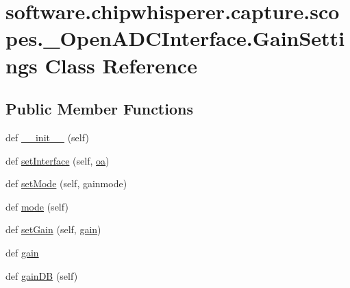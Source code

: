 \hypertarget{classsoftware_1_1chipwhisperer_1_1capture_1_1scopes_1_1__OpenADCInterface_1_1GainSettings}{}\section{software.\+chipwhisperer.\+capture.\+scopes.\+\_\+\+Open\+A\+D\+C\+Interface.\+Gain\+Settings Class Reference}
\label{classsoftware_1_1chipwhisperer_1_1capture_1_1scopes_1_1__OpenADCInterface_1_1GainSettings}
\subsection*{Public Member Functions}
\begin{DoxyCompactItemize}
\item 
def \hyperlink{classsoftware_1_1chipwhisperer_1_1capture_1_1scopes_1_1__OpenADCInterface_1_1GainSettings_a3156c2b37e5de144a8bd6e1d27eb5b51}{\+\_\+\+\_\+init\+\_\+\+\_\+} (self)
\item 
def \hyperlink{classsoftware_1_1chipwhisperer_1_1capture_1_1scopes_1_1__OpenADCInterface_1_1GainSettings_a090ebf3f79f14a254635d31ed47038b5}{set\+Interface} (self, \hyperlink{classsoftware_1_1chipwhisperer_1_1capture_1_1scopes_1_1__OpenADCInterface_1_1GainSettings_ab4a1ae0c6f8dca94fee4757314a227bd}{oa})
\item 
def \hyperlink{classsoftware_1_1chipwhisperer_1_1capture_1_1scopes_1_1__OpenADCInterface_1_1GainSettings_a0258923992f3439f0c5cce42be208897}{set\+Mode} (self, gainmode)
\item 
def \hyperlink{classsoftware_1_1chipwhisperer_1_1capture_1_1scopes_1_1__OpenADCInterface_1_1GainSettings_a4134b99274dc42613327d4bb577cd029}{mode} (self)
\item 
def \hyperlink{classsoftware_1_1chipwhisperer_1_1capture_1_1scopes_1_1__OpenADCInterface_1_1GainSettings_a79d5f54bcfa4e5c15f38e75bb866284e}{set\+Gain} (self, \hyperlink{classsoftware_1_1chipwhisperer_1_1capture_1_1scopes_1_1__OpenADCInterface_1_1GainSettings_a8674b84469ef6fb9c0ce17aecc2ba680}{gain})
\item 
def \hyperlink{classsoftware_1_1chipwhisperer_1_1capture_1_1scopes_1_1__OpenADCInterface_1_1GainSettings_a8674b84469ef6fb9c0ce17aecc2ba680}{gain}
\item 
def \hyperlink{classsoftware_1_1chipwhisperer_1_1capture_1_1scopes_1_1__OpenADCInterface_1_1GainSettings_a7115a77df5cf92c6a76ecbf77815400e}{gain\+D\+B} (self)
\end{DoxyCompactItemize}
